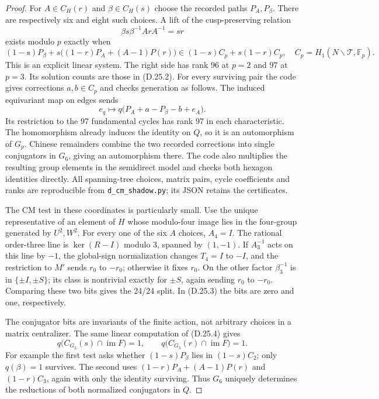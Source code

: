 \begin{proof}
For $A\in C_H(r)$ and $\beta\in C_H(s)$ choose the recorded
paths $P_A,P_\beta$. There are respectively six and eight such
choices. A lift of the cusp-preserving relation
\[
 \beta s\beta^{-1}A rA^{-1}=sr
\]
exists modulo $p$ exactly when
\[
 (1-s)P_\beta+
 s\bigl((1-r)P_A+(A-1)P(r)\bigr)
 \in (1-s)C_p+s(1-r)C_p,\quad
 C_p=H_1(N\backslash\mathcal T,\mathbb F_p).               \tag{D.25.5}
\]
This is an explicit linear system. The right side has rank 96
at $p=2$ and 97 at $p=3$. Its solution counts are those in
(D.25.2). For every surviving pair the code gives corrections
$a,b\in C_p$ and checks generation as follows. The induced
equivariant map on edges sends
\[
 e_q\longmapsto q\bigl(P_A+a-P_\beta-b+e_A\bigr).
\]
Its restriction to the 97 fundamental cycles has rank 97 in
each characteristic. The homomorphism already induces the
identity on $Q$, so it is an automorphism of $G_p$.
Chinese remainders combine the two recorded corrections into
single conjugators in $G_6$, giving an automorphism there.
The code also multiplies the resulting group elements in
the semidirect model and checks both hexagon identities
directly. All spanning-tree choices, matrix pairs, cycle
coefficients and ranks are reproducible from
\texttt{d\_cm\_shadow.py}; its JSON retains the certificates.

The CM test in these coordinates is particularly small.
Use the unique representative of an element of $H$ whose
modulo-four image lies in the four-group generated by
$U^2,W^2$. For every one of the six $A$ choices, $A_4=I$.
The rational order-three line is $\ker(R-I)$ modulo 3, spanned
by $(1,-1)$. If $A_3^{-1}$ acts on this line by $-1$, the
global-sign normalization changes $T_4=I$ to $-I$, and the
restriction to $M'$ sends $r_0$ to $-r_0$; otherwise it fixes
$r_0$. On the other factor $\beta_3^{-1}$ is in
$\{\pm I,\pm S\}$; its class is nontrivial exactly for
$\pm S$, again sending $r_0$ to $-r_0$. Comparing these two
bits gives the 24/24 split. In (D.25.3) the bits are zero and
one, respectively.

The conjugator bits are invariants of the finite action,
not arbitrary choices in a matrix centralizer. The same
linear computation of (D.25.4) gives
\[
 q\bigl(C_{G_2}(s)\cap\operatorname{im}F\bigr)=1,
 \qquad
 q\bigl(C_{G_3}(r)\cap\operatorname{im}F\bigr)=1.          \tag{D.25.6}
\]
For example the first test asks whether
$(1-s)P_\beta$ lies in $(1-s)C_2$; only $q(\beta)=1$
survives. The second uses
$(1-r)P_A+(A-1)P(r)$ and $(1-r)C_3$, again with only the
identity surviving. Thus $G_6$ uniquely determines the
reductions of both normalized conjugators in $Q$.


\end{proof}
